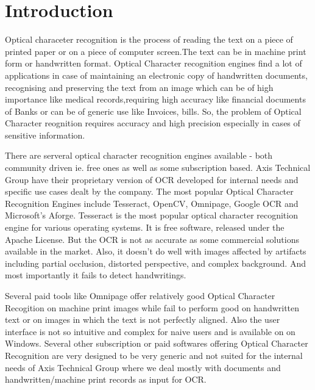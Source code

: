 %

\chapter{Introduction}
Optical characeter recognition is the process of reading the text on a piece of printed paper or on a piece of computer screen.The text can be in machine print form or handwritten format. Optical Character recognition engines find a lot of applications in case of maintaining an electronic copy of handwritten documents, recognising and preserving the text from an image which can be of high importance like medical records,requiring high accuracy like financial documents of Banks or can be of generic use like Invoices, bills. So, the problem of Optical Character reognition requires accuracy and high precision especially in cases of sensitive information.

There are serveral optical character recognition engines available - both community driven ie. free ones as well as some subscription based. Axis Technical Group have their proprietary version of OCR developed for internal needs and specific use cases dealt by the company. The most popular Optical Character Recognition Engines include Tesseract, OpenCV, Omnipage, Google OCR and Microsoft's Aforge. Tesseract is the most popular optical character recognition engine for various operating systems. It is free software, released under the Apache License. But the OCR is not as accurate as some commercial solutions available in the market. Also, it doesn't do well with images affected by artifacts including partial occlusion, distorted perspective, and complex background. And most importantly it fails to detect handwritings.

Several paid tools like Omnipage offer relatively good Optical Character Recogition on machine print images while fail to perform good on handwritten text or on images in which the text is not perfectly aligned. Also the user interface is not so intuitive and complex for naive users and is available on on Windows. Several other subscription or paid softwares offering Optical Character Recognition are very designed to be very generic and not suited for the internal needs of Axis Technical Group where we deal mostly with documents and handwritten/machine print records as input for OCR.

